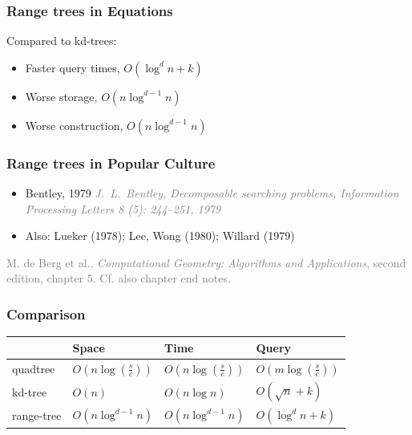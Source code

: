 \documentclass{beamer}
\newcommand\doublestrut{\rule[-1.2ex]{0pt}{3.6ex}}
\newcommand\gray[1]{\textcolor{gray}{#1}}
\newcommand\smallgray[1]{\textcolor{gray}{\small\it #1}}
\begin{document}
\begin{frame}
  \frametitle{Range trees in Equations}
  Compared to kd-trees:
  \begin{itemize}
  \item Faster query times, $O(\log^d n + k)$
  \item Worse storage, $O(n \log^{d-1} n)$
  \item Worse construction,  $O(n\log^{d-1} n)$
  \end{itemize}
\end{frame}

\begin{frame}
  \frametitle{Range trees in Popular Culture}
  \begin{itemize}
  \item Bentley, 1979
    \smallgray{J.~L.~Bentley, Decomposable
      searching problems, Information Processing Letters 8 (5):
      244–251, 1979}
  \item Also: Lueker (1978); Lee, Wong (1980); Willard (1979)
  \end{itemize}

  \bigskip \gray{ 
    M. de Berg et al., \textit{Computational Geometry: Algorithms and
      Applications}, second edition, chapter 5.  Cf. also chapter end
    notes.}
  

\end{frame}

\begin{frame}
  \frametitle{Comparison}

  \begin{tabular}{|l|l|l|l|}
    \hline
    & Space & Time & Query \\
    \hline
    \hline\doublestrut
    quadtree & $O\left(n\log \left(\frac sc\right)\right)$ & $O\left(n\log \left(\frac
      sc\right)\right)$ & $O\left(m\log \left(\frac sc\right)\right)$ \\
    \hline\doublestrut
    kd-tree & $O(n)$ & $O(n\log n)$ & $O(\sqrt n + k)$ \\
    \hline\doublestrut
    range-tree &  $O(n\log^{d-1} n)$ &  $O(n\log^{d-1} n)$ & $O(\log^d n + k)$ \\
    \hline
  \end{tabular}

\end{frame}
\end{document}
